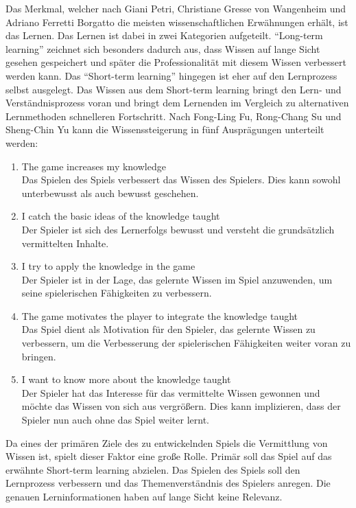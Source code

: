 	Das Merkmal, welcher nach Giani Petri, Christiane Gresse von Wangenheim und Adriano Ferretti Borgatto die meisten wissenschaftlichen Erwähnungen erhält, ist das Lernen. Das Lernen ist dabei in zwei Kategorien aufgeteilt. \enquote{Long-term learning} zeichnet sich besonders dadurch aus, dass Wissen auf lange Sicht gesehen gespeichert und später die Professionalität mit diesem Wissen verbessert werden kann. Das \enquote{Short-term learning} hingegen ist eher auf den Lernprozess selbst ausgelegt. Das Wissen aus dem Short-term learning bringt den Lern- und Verständnisprozess voran und bringt dem Lernenden im Vergleich zu alternativen Lernmethoden schnelleren Fortschritt. Nach Fong-Ling Fu, Rong-Chang Su und Sheng-Chin Yu kann die Wissenssteigerung in fünf Ausprägungen unterteilt werden:
	\begin{enumerate}
		\item{The game increases my knowledge} \hfill \\
		Das Spielen des Spiels verbessert das Wissen des Spielers. Dies kann sowohl unterbewusst als auch bewusst geschehen.
		\item{I catch the basic ideas of the knowledge taught} \hfill \\
		Der Spieler ist sich des Lernerfolgs bewusst und versteht die grundsätzlich vermittelten Inhalte.
		\item{I try to apply the knowledge in the game}\hfill \\
		Der Spieler ist in der Lage, das gelernte Wissen im Spiel anzuwenden, um seine spielerischen Fähigkeiten zu verbessern.
		\item{The game motivates the player to integrate the knowledge taught}\hfill \\
		Das Spiel dient als Motivation für den Spieler, das gelernte Wissen zu verbessern, um die Verbesserung der spielerischen Fähigkeiten weiter voran zu bringen.
		\item{I want to know more about the knowledge taught}\hfill \\
		Der Spieler hat das Interesse für das vermittelte Wissen gewonnen und möchte das Wissen von sich aus vergrößern. Dies kann implizieren, dass der Spieler nun auch ohne das Spiel weiter lernt.
	\end{enumerate}
	Da eines der primären Ziele des zu entwickelnden Spiels die Vermittlung von Wissen ist, spielt dieser Faktor eine große Rolle. Primär soll das Spiel auf das erwähnte Short-term learning abzielen. Das Spielen des Spiels soll den Lernprozess verbessern und das Themenverständnis des Spielers anregen. Die genauen Lerninformationen haben auf lange Sicht keine Relevanz.

